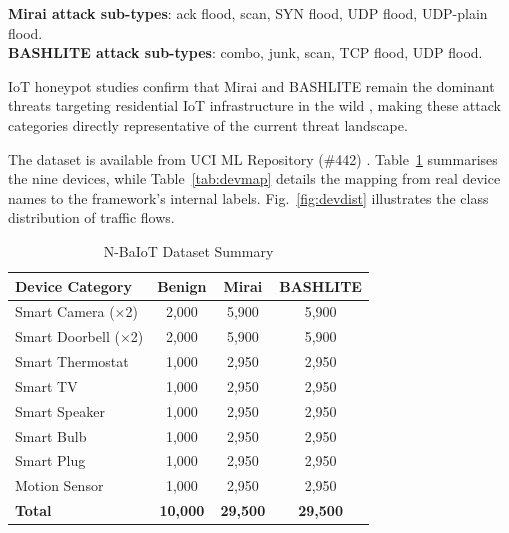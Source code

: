 \documentclass[conference]{IEEEtran}
\begin{document}
\textbf{Mirai attack sub-types}: ack flood, scan, SYN flood, UDP flood,
UDP-plain flood.\\
\textbf{BASHLITE attack sub-types}: combo, junk, scan, TCP flood, UDP flood.

IoT honeypot studies confirm that Mirai and BASHLITE remain the dominant
threats targeting residential IoT infrastructure in the wild
\cite{pa2016iotpot}, making these attack categories directly representative
of the current threat landscape.

The dataset is available from UCI ML Repository (\#442) \cite{meidan2018nbaiot}.
Table~\ref{tab:dataset} summarises the nine devices, while Table~\ref{tab:devmap}
details the mapping from real device names to the framework's internal labels.
Fig.~\ref{fig:devdist} illustrates the class distribution of traffic flows.

\begin{table}[htbp]
\caption{N-BaIoT Dataset Summary}
\label{tab:dataset}
\centering
\renewcommand{\arraystretch}{1.2}
\begin{tabular}{l c c c}
\toprule
\textbf{Device Category} & \textbf{Benign} & \textbf{Mirai} & \textbf{BASHLITE} \\
\midrule
Smart Camera (×2)        & 2,000  & 5,900  & 5,900  \\
Smart Doorbell (×2)      & 2,000  & 5,900  & 5,900  \\
Smart Thermostat         & 1,000  & 2,950  & 2,950  \\
Smart TV                 & 1,000  & 2,950  & 2,950  \\
Smart Speaker            & 1,000  & 2,950  & 2,950  \\
Smart Bulb               & 1,000  & 2,950  & 2,950  \\
Smart Plug               & 1,000  & 2,950  & 2,950  \\
Motion Sensor            & 1,000  & 2,950  & 2,950  \\
\midrule
\textbf{Total}           & \textbf{10,000} & \textbf{29,500} & \textbf{29,500} \\
\bottomrule
\end{tabular}
\end{table}
\end{document}
